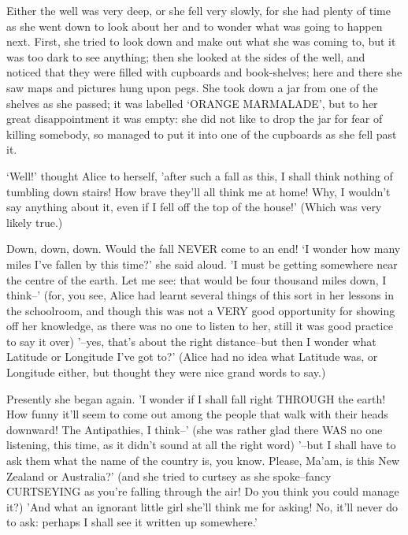 \documentclass{article}
\begin{document}
\begin{multicols}{2}
Either the well was very deep, or she fell very slowly, for she had
plenty of time as she went down to look about her and to wonder what was
going to happen next. First, she tried to look down and make out what
she was coming to, but it was too dark to see anything; then she
looked at the sides of the well, and noticed that they were filled with
cupboards and book-shelves; here and there she saw maps and pictures
hung upon pegs. She took down a jar from one of the shelves as
she passed; it was labelled `ORANGE MARMALADE', but to her great
disappointment it was empty: she did not like to drop the jar for fear
of killing somebody, so managed to put it into one of the cupboards as
she fell past it.

`Well!' thought Alice to herself, 'after such a fall as this, I shall
think nothing of tumbling down stairs! How brave they'll all think me at
home! Why, I wouldn't say anything about it, even if I fell off the top
of the house!' (Which was very likely true.)

Down, down, down. Would the fall NEVER come to an end! `I wonder how
many miles I've fallen by this time?' she said aloud. 'I must be getting
somewhere near the centre of the earth. Let me see: that would be four
thousand miles down, I think--' (for, you see, Alice had learnt several
things of this sort in her lessons in the schoolroom, and though this
was not a VERY good opportunity for showing off her knowledge, as there
was no one to listen to her, still it was good practice to say it over)
'--yes, that's about the right distance--but then I wonder what Latitude
or Longitude I've got to?' (Alice had no idea what Latitude was, or
Longitude either, but thought they were nice grand words to say.)

Presently she began again. 'I wonder if I shall fall right THROUGH the
earth! How funny it'll seem to come out among the people that walk with
their heads downward! The Antipathies, I think--' (she was rather glad
there WAS no one listening, this time, as it didn't sound at all the
right word) '--but I shall have to ask them what the name of the country
is, you know. Please, Ma'am, is this New Zealand or Australia?' (and
she tried to curtsey as she spoke--fancy CURTSEYING as you're falling
through the air! Do you think you could manage it?) 'And what an
ignorant little girl she'll think me for asking! No, it'll never do to
ask: perhaps I shall see it written up somewhere.'


\end{multicols}
\end{document}
